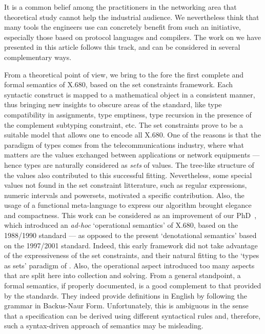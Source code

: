 
It is a common belief among the practitioners in the networking area
that theoretical study cannot help the industrial audience. We
nevertheless think that many tools the engineers use can concretely
benefit from such an initiative, especially those based on protocol
languages and compilers. The work on \ASN we have presented in this
article follows this track, and can be considered in several
complementary ways.

From a theoretical point of view, we bring to the fore the first
complete and formal semantics of \mbox{X.680}, based on the set
constraints framework. Each syntactic construct is mapped to a
mathematical object in a consistent manner, thus bringing new insights
to obscure areas of the standard, like type compatibility in
assignments, type emptiness, type recursion in the presence of the
complement subtyping constraint, etc. The set constraints prove to be
a suitable model that allows one to encode all \mbox{X.680}. One of
the reasons is that the paradigm of \ASN types comes from the
telecommunications industry, where what matters are the values
exchanged between applications or network equipments --- hence types
are naturally considered as \emph{sets} of values. The tree-like
structure of the \ASN values also contributed to this successful
fitting. Nevertheless, some special values not found in the set
constraint litterature, such as regular expressions, numeric intervals
and powersets, motivated a specific contribution. Also, the usage of a
functional meta-language to express our algorithm brought elegance and
compactness. This work can be considered as an improvement of our
PhD~\cite{myPhD}, which introduced an \emph{ad-hoc} `operational
semantics' of X.680, based on the 1988/1990 standard --- as opposed to
the present `denotational semantics' based on the 1997/2001
standard. Indeed, this early framework did not take advantage of the
expressiveness of the set constraints, and their natural fitting to
the `types as sets' paradigm of \ASN. Also, the operational aspect
introduced too many aspects that are split here into collection and
solving. From a general standpoint, a formal semantics, if properly
documented, is a good complement to that provided by the
standards. They indeed provide definitions in English by following the
\ASN grammar in Backus-Naur Form. Unfortunately, this is ambiguous in
the sense that a specification can be derived using different
syntactical rules and, therefore, such a syntax-driven approach of
semantics may be misleading.

